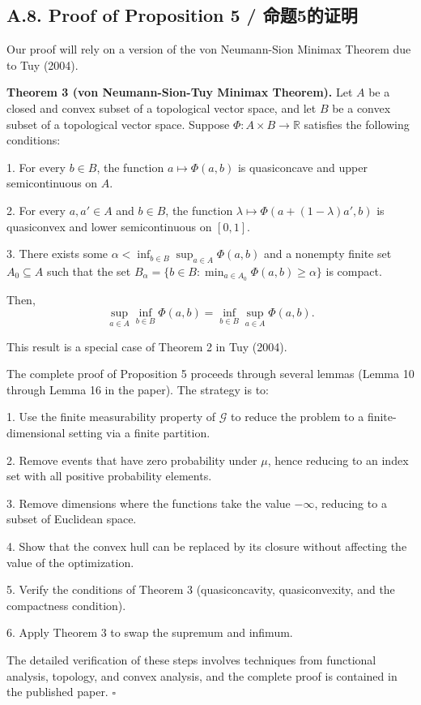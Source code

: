 \documentclass[12pt,a4paper]{article}
\newenvironment{original}
  {\par\noindent\color{black}\smallskip}
  {\par\smallskip}
\begin{document}
\subsection*{A.8. Proof of Proposition 5 / 命题5的证明}

\begin{original}
Our proof will rely on a version of the von Neumann-Sion Minimax Theorem due to Tuy (2004).

\textbf{Theorem 3 (von Neumann-Sion-Tuy Minimax Theorem).} Let $A$ be a closed and convex subset of a topological vector space, and let $B$ be a convex subset of a topological vector space. Suppose $\Phi: A \times B \to \mathbb{R}$ satisfies the following conditions:

1. For every $b \in B$, the function $a \mapsto \Phi(a, b)$ is quasiconcave and upper semicontinuous on $A$.

2. For every $a, a' \in A$ and $b \in B$, the function $\lambda \mapsto \Phi(a + (1-\lambda)a', b)$ is quasiconvex and lower semicontinuous on $[0, 1]$.

3. There exists some $\alpha < \inf_{b \in B} \sup_{a \in A} \Phi(a, b)$ and a nonempty finite set $A_0 \subseteq A$ such that the set $B_\alpha = \{ b \in B : \min_{a \in A_0} \Phi(a, b) \geq \alpha \}$ is compact.

Then,
\[
\sup_{a \in A} \inf_{b \in B} \Phi(a, b) = \inf_{b \in B} \sup_{a \in A} \Phi(a, b).
\]

This result is a special case of Theorem 2 in Tuy (2004).

The complete proof of Proposition 5 proceeds through several lemmas (Lemma 10 through Lemma 16 in the paper). The strategy is to:

1. Use the finite measurability property of $\mathcal{G}$ to reduce the problem to a finite-dimensional setting via a finite partition.

2. Remove events that have zero probability under $\mu$, hence reducing to an index set with all positive probability elements.

3. Remove dimensions where the functions take the value $-\infty$, reducing to a subset of Euclidean space.

4. Show that the convex hull can be replaced by its closure without affecting the value of the optimization.

5. Verify the conditions of Theorem 3 (quasiconcavity, quasiconvexity, and the compactness condition).

6. Apply Theorem 3 to swap the supremum and infimum.

The detailed verification of these steps involves techniques from functional analysis, topology, and convex analysis, and the complete proof is contained in the published paper. $\square$
\end{original}
\end{document}
